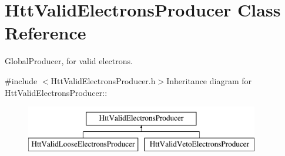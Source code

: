 \hypertarget{classHttValidElectronsProducer}{
\section{HttValidElectronsProducer Class Reference}
\label{classHttValidElectronsProducer}
}


GlobalProducer, for valid electrons.  


{\ttfamily \#include $<$HttValidElectronsProducer.h$>$}Inheritance diagram for HttValidElectronsProducer::\begin{figure}[H]
\begin{center}
\leavevmode
\includegraphics[height=2cm]{classHttValidElectronsProducer}
\end{center}
\end{figure}
